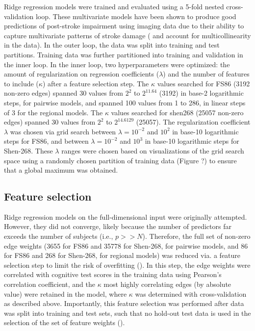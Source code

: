 \documentclass[10pt]{article}
\begin{document}
Ridge regression models were trained and evaluated using a 5-fold nested cross-validation loop. These multivariate models have been shown to produce good predictions of post-stroke impairment using imaging data due to their ability to capture multivariate patterns of stroke damage (\cite{Salvalaggio2020-pe} and account for multicollinearity in the data). In the outer loop, the data was split into training and test partitions. Training data was further partitioned into training and validation in the inner loop. In the inner loop, two hyperparameters were optimized: the amount of regularization on regression coefficients ($\lambda$) and the number of features to include ($\kappa$) after a feature selection step. The $\kappa$ values searched for FS86 (3192 non-zero edges) spanned 30 values from $2^2$ to $2^{11.64}$ (3192) in base-2 logarithmic steps, for pairwise models, and spanned 100 values from 1 to 286, in linear steps of 3 for the regional models. The $\kappa$ values searched for shen268  (25057 non-zero edges) spanned 30 values from $2^2$ to $2^{14.6129}$ (25057). The regularization coefficient $\lambda$ was chosen via grid search between $\lambda = 10^{-2}$ and $10^2$ in base-10 logarithmic steps for FS86, and between $\lambda = 10^{-2}$ and $10^3$ in base-10 logarithmic steps for Shen-268. These $\lambda$ ranges were chosen based on visualizations of the grid search space using a randomly chosen partition of training data (Figure ?) to ensure that a global maximum was obtained.


\subsection{Feature selection}
Ridge regression models on the full-dimensional input were originally attempted. However, they did not converge, likely because the number of predictors far exceeds the number of subjects (i.e., $p >> N$). Therefore, the full set of non-zero edge weights (3655 for FS86 and 35778 for Shen-268, for pairwise models, and 86 for FS86 and 268 for Shen-268, for regional models) was reduced via. a feature selection step to limit the risk of overfitting (\cite{Calesella2021-kp}). In this step, the edge weights were correlated with cognitive test scores in the training data using Pearson's correlation coefficient, and the $\kappa$ most highly correlating edges (by absolute value) were retained in the model, where $\kappa$ was determined with cross-validation as described above. Importantly, this feature selection was performed after data was split into training and test sets, such that no hold-out test data is used in the selection of the set of feature weights (\cite{Hastie2001-or}). 
\end{document}
